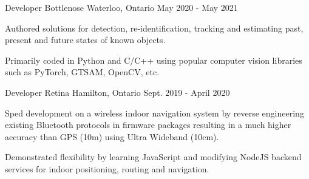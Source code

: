 
\begin{cventries}

  \cventry
    {Developer} %
    {Bottlenose} %
    {Waterloo, Ontario} %
    {May 2020 - May 2021} %
    {
      \begin{cvitems} %
        \item {Authored solutions for detection, re-identification, tracking and estimating past, present and future states of known objects.}
        \item {Primarily coded in Python and C/C++ using popular computer vision libraries such as PyTorch, GTSAM, OpenCV, etc.}
      \end{cvitems}
    }


  \cventry
    {Developer} %
    {Retina} %
    {Hamilton, Ontario} %
    {Sept. 2019 - April 2020} %
    {
      \begin{cvitems} %
        \item {Sped development on a wireless indoor navigation system by reverse engineering existing Bluetooth protocols in firmware packages resulting in a much higher accuracy than GPS (10m) using Ultra Wideband (10cm).}
        \item {Demonstrated flexibility by learning JavaScript and modifying NodeJS backend services for indoor positioning, routing and navigation.}
      \end{cvitems}
    }


\end{cventries}
